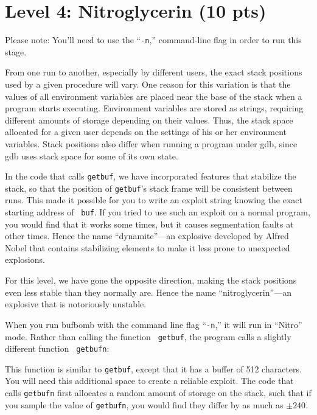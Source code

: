 \documentclass[11pt]{article}
\newenvironment{ccode}%
{\small}%
{}
\begin{document}
\section*{Level 4: Nitroglycerin (10 pts)}

Please note: You'll need to use the ``{\tt -n},'' command-line flag in
order to run this stage.

From one run to another, especially by different users, the exact
stack positions used by a given procedure will vary.  One reason for
this variation is that the values of all environment variables are
placed near the base of the stack when a program starts executing.
Environment variables are stored as strings, requiring different
amounts of storage depending on their values.  Thus, the stack space
allocated for a given user depends on the settings of his or her
environment variables.  Stack positions also differ when running a
program under {\sc gdb}, since {\sc gdb} uses stack space for some of its
own state.

In the code that calls {\tt getbuf}, we have incorporated features
that stabilize the stack, so that the position of {\tt getbuf}'s stack
frame will be consistent between runs.  This made it possible for you
to write an exploit string knowing the exact starting address of {\tt
buf}.  If you tried to use such an exploit on a normal program, you
would find that it works some times, but it causes segmentation faults
at other times.  Hence the name ``dynamite''---an explosive developed
by Alfred Nobel that contains stabilizing elements to make it less
prone to unexpected explosions.

For this level, we have gone the opposite direction, making the stack
positions even less stable than they normally are.  Hence the name
``nitroglycerin''---an explosive that is notoriously unstable.

When you run {\sc bufbomb} with the command line flag ``{\tt -n},'' it
will run in ``Nitro'' mode.  Rather than calling the function {\tt
getbuf}, the program calls a slightly different function {\tt
getbufn}:

\begin{ccode}

\end{ccode}

This function is similar to {\tt getbuf}, except that it has a buffer
of 512 characters.  You will need this additional space to create a
reliable exploit.  The code that calls {\tt getbufn} first allocates a
random amount of storage on the stack,
such that if you
sample the value of \verb@%ebp@ during two successive executions of
{\tt getbufn}, you would find they differ by as much as $\pm 240$.
\end{document}
